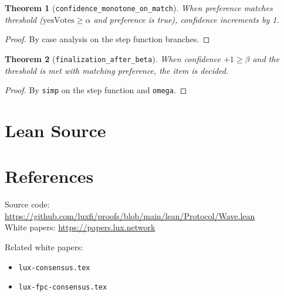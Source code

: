 \documentclass[11pt]{article}
\newtheorem{theorem}{Theorem}
\begin{document}
\begin{theorem}[\texttt{confidence\_monotone\_on\_match}]
When preference matches threshold ($\text{yesVotes} \geq \alpha$ and preference is true), confidence increments by 1.
\end{theorem}
\begin{proof}
By case analysis on the step function branches.
\end{proof}

\begin{theorem}[\texttt{finalization\_after\_beta}]
When confidence $+1 \geq \beta$ and the threshold is met with matching preference, the item is decided.
\end{theorem}
\begin{proof}
By \texttt{simp} on the step function and \texttt{omega}.
\end{proof}


\section{Lean Source}


\section{References}
\noindent Source code: \url{https://github.com/luxfi/proofs/blob/main/lean/Protocol/Wave.lean}\\
\noindent White papers: \url{https://papers.lux.network}

\noindent Related white papers:
\begin{itemize}
  \item \texttt{lux-consensus.tex}
  \item \texttt{lux-fpc-consensus.tex}
\end{itemize}
\end{document}

